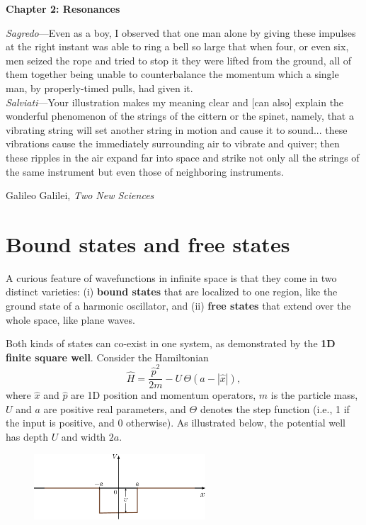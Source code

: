 \documentclass[pra,12pt]{revtex4}
\begin{document}
\setcounter{page}{18}

\setlength{\epigraphwidth}{0.7\textwidth}

\begin{center}
{\Large \textbf{Chapter 2: Resonances}}
\end{center}

\epigraph{
\textit{Sagredo}---Even as a boy, I observed that one man alone by giving these impulses at the right instant was able to ring a bell so large that when four, or even six, men seized the rope and tried to stop it they were lifted from the ground, all of them together being unable to counterbalance the momentum which a single man, by properly-timed pulls, had given it. \\ \vskip0.1in
\textit{Salviati}---Your illustration makes my meaning clear and [can also] explain the wonderful phenomenon of the strings of the cittern or the spinet, namely, that a vibrating string will set another string in motion and cause it to sound... these vibrations cause the immediately surrounding air to vibrate and quiver; then these ripples in the air expand far into space and strike not only all the strings of the same instrument but even those of neighboring instruments.}{Galileo Galilei, \textit{Two New Sciences}}

\section{Bound states and free states}

A curious feature of wavefunctions in infinite space is that they come
in two distinct varieties: (i) \textbf{bound states} that are
localized to one region, like the ground state of a harmonic
oscillator, and (ii) \textbf{free states} that extend over the whole
space, like plane waves.

Both kinds of states can co-exist in one system, as demonstrated by
the \textbf{1D finite square well}.  Consider the Hamiltonian
\begin{equation}
  \hat{H} = \frac{\hat{p}^2}{2m} - U \,\Theta(a -|\hat{x}|),
\end{equation}
where $\hat{x}$ and $\hat{p}$ are 1D position and momentum operators,
$m$ is the particle mass, $U$ and $a$ are positive real parameters,
and $\Theta$ denotes the step function (i.e., 1 if the input is
positive, and 0 otherwise).  As illustrated below, the potential well
has depth $U$ and width $2a$.

\begin{figure}[h]
  \centering\includegraphics[width=0.57\textwidth]{squarewell}
\end{figure}
\end{document}
